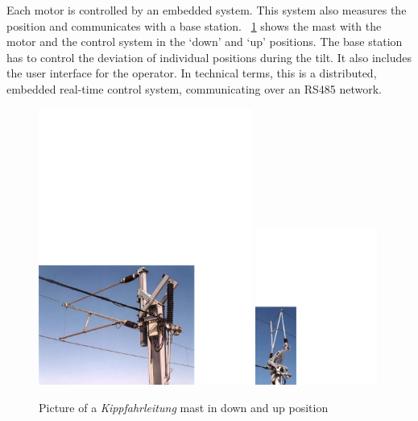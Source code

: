 Each motor is controlled by an embedded system. This system also
measures the position and communicates with a base station.
\figurename~\ref{fig:results:kfl:mast} shows the mast with the motor
and the control system in the `down' and `up' positions. The base
station has to control the deviation of individual positions during
the tilt. It also includes the user interface for the operator. In
technical terms, this is a distributed, embedded real-time control
system, communicating over an RS485 network.

\begin{figure}
    \centering
    \includegraphics[width=7cm]{results/results_kfl_mast1}
    \hspace{1cm}
    \includegraphics[width=4cm]{results/results_kfl_mast2}
    \caption{Picture of a \emph{Kippfahrleitung} mast in down and up position}
    \label{fig:results:kfl:mast}
\end{figure}



